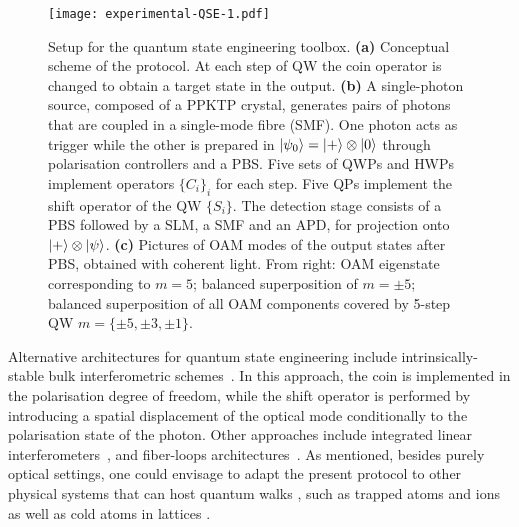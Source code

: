 

\begin{figure}[tb]
\texttt{[image: experimental-QSE-1.pdf]}
\caption{
	Setup for the quantum state engineering toolbox.
	\textbf{(a)} Conceptual scheme of the protocol. At each step of \ac{QW} the coin operator is changed to obtain a target state in the output.
	\textbf{(b)} A single-photon source, composed of a \ac{PPKTP} crystal, generates pairs of photons that are coupled in a single-mode fibre (SMF). One photon acts as trigger while the other is prepared in $\ket{\psi_0}=\ket{+}\otimes \ket{0}$ through polarisation controllers and a \ac{PBS}. Five sets of \acp{QWP} and \acp{HWP}  implement operators $\{ C_i\}_i$ for each step. Five \acp{QP} implement the shift operator of the \ac{QW} $\{S_i\}$.
	The detection stage consists of a \ac{PBS} followed by a \ac{SLM}, a \ac{SMF} and an \ac{APD}, for projection onto $\ket{+} \otimes \ket{\psi}$.
	\textbf{(c)} Pictures of \ac{OAM} modes of the output states after \ac{PBS}, obtained with coherent light. From right: \ac{OAM} eigenstate corresponding to $m=5$; balanced superposition of $m=\pm 5$; balanced superposition of all \ac{OAM} components covered by 5-step \ac{QW} $m=\{\pm 5, \pm 3, \pm 1\}$.
}
\label{fig:expQWs:schematics}
\end{figure}

Alternative architectures for quantum state engineering include intrinsically-stable bulk interferometric schemes~\cite{broome2010discrete,kitagawa2012observation,vitelli2013joining}.
In this approach, the coin is implemented in the polarisation degree of freedom,
while the shift operator is performed by introducing a spatial displacement of the optical mode conditionally to the polarisation state of the photon.
Other approaches include integrated linear interferometers~\cite{sansoni2012twoparticle, crespi2013anderson, harris2015bosonic, pitsios2016photonic}, and fiber-loops architectures~\cite{schreiber2010photons, schreiber2012a, boutari2016large}. As mentioned, besides purely optical settings, one could envisage to adapt the present protocol to other physical systems that can host quantum walks \cite{manouchehri2014physical}, such as trapped atoms \cite{karski2009quantum} and ions \cite{schmitz2009quantum, zhringer2010realization} as well as cold atoms in lattices \cite{weitenberg2011singlespin, fukuhara2013microscopic, preiss2015strongly}.

